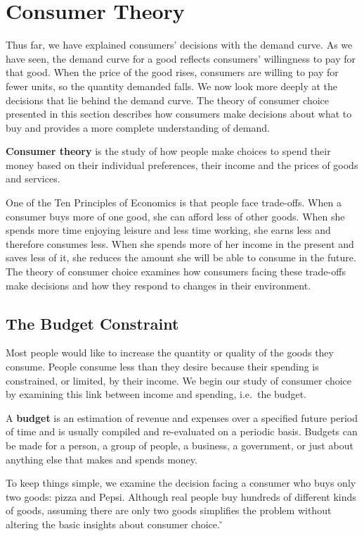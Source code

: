 \section{Consumer Theory}

Thus far, we have explained consumers' decisions with the demand curve. As we have seen, the demand curve for a good
reflects consumers' willingness to pay for that good. When the price of the good rises, consumers are willing to pay
for fewer units, so the quantity demanded falls. We now look more deeply at the decisions that lie behind the demand
curve. The theory of consumer choice presented in this section describes how consumers make decisions about what to
buy and provides a more complete understanding of demand.

\textbf{Consumer theory} is the study of how people make choices to spend their money based on their individual
preferences, their income and the prices of goods and services.
\ed

One of the Ten Principles of Economics is that people face trade-offs. When a consumer buys more of one good, she can
afford less of other goods. When she spends more time enjoying leisure and less time working, she earns less and
therefore consumes less. When she spends more of her income in the present and saves less of it, she reduces the
amount she will be able to consume in the future. The theory of consumer choice examines how consumers facing these
trade-offs make decisions and how they respond to changes in their environment.

\subsection{The Budget Constraint}

Most people would like to increase the quantity or quality of the goods they consume. People consume less than they
desire because their spending is constrained, or limited, by their income. We begin our study of consumer choice by
examining this link between income and spending, i.e.\ the budget.

\bd[Budget]
A \textbf{budget} is an estimation of revenue and expenses over a specified future period of time and is usually
compiled and re-evaluated on a periodic basis. Budgets can be made for a person, a group of people, a business, a
government, or just about anything else that makes and spends money.
\ed

To keep things simple, we examine the decision facing a consumer who buys only two goods: pizza and Pepsi. Although
real people buy hundreds of different kinds of goods, assuming there are only two goods simplifies the problem
without altering the basic insights about consumer choice. \v


